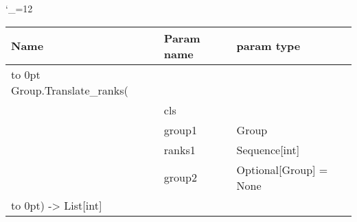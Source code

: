 \begingroup \catcode`\_=12 \tt
\begin{tabular}{lll}
\toprule
\textrm{Name}&\textrm{Param name}&\textrm{param type}\\
\midrule
\hbox to 0pt {Group.Translate_ranks(\hss}\\
& cls\\
& group1 & Group\\
& ranks1 & Sequence[int]\\
& group2 & Optional[Group] = None\\
\hbox to 0pt{) -> List[int]\hss}\\
\bottomrule
\end{tabular}
\endgroup
